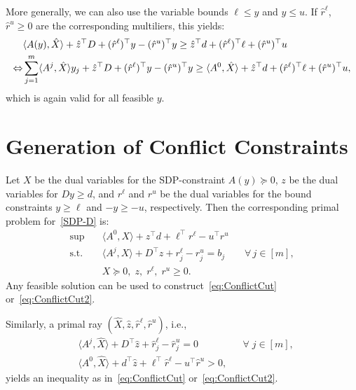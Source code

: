 \documentclass[10pt, a4paper]{article}
\newcommand{\skal}[2]{\langle{#1},{#2}\rangle}
\newcommand{\T}{^{\top}}
\begin{document}
More generally, we can also use the variable bounds $\ell \leq y$ and
$y \leq u$. If $\hat{r}^\ell$, $\hat{r}^u \geq 0$ are the corresponding
multiliers, this yields:
\begin{align}
  & \skal{A(y)}{\hat{X}} + \hat{z}\T D + (\hat{r}^\ell)\T y - (\hat{r}^u)\T y
    \geq \hat{z}\T d + (\hat{r}^\ell)\T \ell + (\hat{r}^u)\T u\notag\\
  \Leftrightarrow
  & \sum_{j=1}^m \skal{A^j}{\hat{X}} y_j + \hat{z}\T D +
    (\hat{r}^\ell)\T y - (\hat{r}^u)\T y \geq \skal{A^0}{\hat{X}} +
    \hat{z}\T d + (\hat{r}^\ell)\T \ell + (\hat{r}^u)\T u,\label{eq:ConflictCut2}
\end{align}
which is again valid for all feasible $y$.


\section{Generation of Conflict Constraints}

Let $X$ be the dual variables for the SDP-constraint $A(y) \succeq 0$, $z$
be the dual variables for $Dy \geq d$, and $r^\ell$ and $r^u$ be the dual
variables for the bound constraints $y \geq \ell$ and $-y \geq -u$,
respectively. Then the corresponding primal problem for~\eqref{SDP-D} is:
\begin{equation}\label{SDP-P}
  \begin{aligned}
     \sup \quad & \skal{A^0}{X} + z\T d + \ell\T r^\ell - u\T r^u\\
     \text{s.t.} \quad & \skal{A^j}{X} + D\T z + r^\ell_j - r^u_j = b_j && \forall \, j \in [m],\\
     & X \succeq 0,\; z, \; r^\ell,\; r^u \geq 0.
  \end{aligned}
\end{equation}
Any feasible solution can be used to construct~\eqref{eq:ConflictCut}
or~\eqref{eq:ConflictCut2}.

Similarly, a primal ray $(\hat{X}, \hat{z}, \hat{r}^\ell, \hat{r}^u)$,
i.e.,
\begin{equation}\label{eq:ray}
\begin{aligned}
  & \skal{A^j}{\hat{X}} + D\T \hat{z} + \hat{r}^\ell_j - \hat{r}^u_j = 0 && \forall\; j \in [m],\\
  & \skal{A^0}{\hat{X}} + d\T \hat{z} + \ell\T \hat{r}^\ell - u\T \hat{r}^u > 0,
\end{aligned}
\end{equation}
yields an inequality as in~\eqref{eq:ConflictCut}
or~\eqref{eq:ConflictCut2}.
\end{document}
